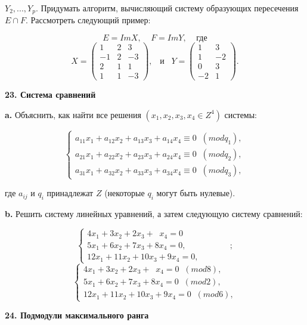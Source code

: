 \pagebreak

\noindent$ Y_2,...,Y_p. $ Придумать алгоритм, вычисляющий систему образующих 
пересечения $E\cap F$. Рассмотреть следующий пример: 


$$ E=ImX,\;\;\;\;F=ImY,\;\;\;\;\text{где} $$ 
$$X=\begin{pmatrix}
1 & 2 & 3  \\
-1 & 2 & -3 \\
2 & 1 & 1 \\
1 & 1 & -3 
\end{pmatrix},\;\;\;\text{и}\;\;\;
Y=\begin{pmatrix}
1 & 3 \\
1 & -2  \\
0 & 3 \\
-2 & 1  
\end{pmatrix}.$$ 

{\noindent\bf23. Система сравнений} 

\medskip

{\bf a.} Объяснить, как найти все решения $ (x_1,x_2,x_3,x_4 \in Z^4) $ системы: 


$$ \begin{cases}
 a_{11}x_1 +a_{12}x_2 + a_{13}x_3 + a_{14}x_4\equiv 0\;\; (mod q_1),\\
 a_{21}x_1 +a_{22}x_2 + a_{23}x_3 + a_{24}x_4\equiv 0\;\; (mod q_2),\\
 a_{31}x_1 +a_{32}x_2 + a_{33}x_3 + a_{34}x_4\equiv 0\;\; (mod q_3),
 \end{cases}$$ 

\noindent где $a_{ij}$ и $q_i$ принадлежат $Z$ (некоторые $q_i$ могут быть нулевые). 

\medskip

{\bf b.} Решить систему линейных уравнений, а затем следующую 
систему сравнений: 


 $$\begin{cases}
 4x_1 + 3x_2 + 2x_3 + \;\;x_4=0\\
 5x_1 + 6x_2 + 7x_3 + 8x_4=0,\\
 12x_1 + 11x_2 + 10x_3 + 9x_4=0,
 \end{cases}\;\;\;\;\;\;\;\;\;\;\;\;;$$
 $$ \begin{cases}
4x_1 + 3x_2 + 2x_3 + \;\;x_4=0\;\; (mod 8),\\
 5x_1 + 6x_2 + 7x_3 + 8x_4=0\;\; (mod 2),\\
 12x_1 + 11x_2 + 10x_3 + 9x_4=0\;\; (mod 6),
 \end{cases}$$ 


{\noindent\bf24. Подмодули максимального ранга} 

